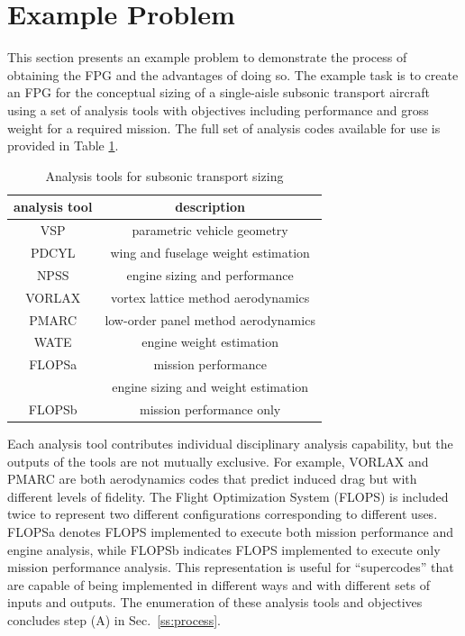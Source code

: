 \section{Example Problem}
	\label{s:example problem}
	This section presents an example problem to demonstrate the process of obtaining the FPG and the advantages of doing so. 
The example task is to create an FPG for the conceptual sizing of a single-aisle subsonic transport aircraft using a set of analysis tools with objectives including performance and gross weight for a required mission. 
	The full set of analysis codes available for use is provided in Table \ref{t:analysis codes}.
	\begin{table}[htbp]
	  \centering
	  \caption{Analysis tools for subsonic transport sizing}
		\begin{tabular}{cc}
		\toprule
		analysis tool & description \\
		\midrule
		VSP   & parametric vehicle geometry \\
		PDCYL & wing and fuselage weight estimation \\
		NPSS  & engine sizing and performance \\
		VORLAX & vortex lattice method  aerodynamics \\
		PMARC & low-order panel method  aerodynamics \\
		WATE  & engine weight estimation \\
		FLOPSa & mission performance \\
		  & engine sizing and weight estimation \\
		FLOPSb & mission performance only \\
		\bottomrule
		\end{tabular}%
	  \label{t:analysis codes}%
	\end{table}%
	Each analysis tool contributes individual disciplinary analysis capability, but the outputs of the tools are not mutually exclusive. 
	For example, VORLAX and PMARC are both aerodynamics codes that predict induced drag but with different levels of fidelity. 
	The Flight Optimization System (FLOPS) is included twice to represent two different configurations corresponding to different uses. 
	FLOPSa denotes FLOPS implemented to execute both mission performance and engine analysis, while FLOPSb indicates  FLOPS implemented to execute only mission performance analysis. 
	This representation is useful for ``supercodes'' that are capable of being implemented in different ways and with different sets of inputs and outputs.
The enumeration of these analysis tools and objectives concludes step (A) in Sec.~\ref{ss:process}.

